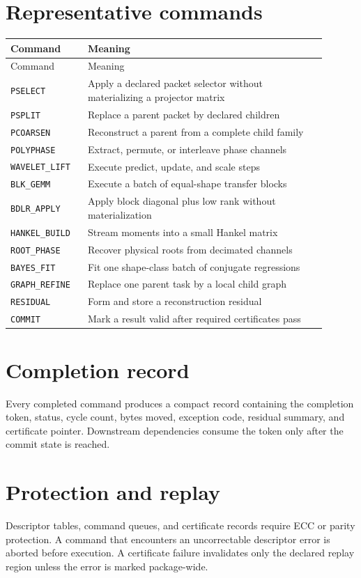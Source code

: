 \documentclass[11pt,oneside,openany]{book}
\theoremstyle{remark}
\begin{document}
\section{Representative commands}
\begin{longtable}{L{0.22\linewidth}L{0.68\linewidth}}
\toprule
Command & Meaning \\
\midrule
\endfirsthead
\toprule
Command & Meaning \\
\midrule
\endhead
\texttt{PSELECT} & Apply a declared packet selector without materializing a projector matrix \\
\texttt{PSPLIT} & Replace a parent packet by declared children \\
\texttt{PCOARSEN} & Reconstruct a parent from a complete child family \\
\texttt{POLYPHASE} & Extract, permute, or interleave phase channels \\
\texttt{WAVELET\_LIFT} & Execute predict, update, and scale steps \\
\texttt{BLK\_GEMM} & Execute a batch of equal-shape transfer blocks \\
\texttt{BDLR\_APPLY} & Apply block diagonal plus low rank without materialization \\
\texttt{HANKEL\_BUILD} & Stream moments into a small Hankel matrix \\
\texttt{ROOT\_PHASE} & Recover physical roots from decimated channels \\
\texttt{BAYES\_FIT} & Fit one shape-class batch of conjugate regressions \\
\texttt{GRAPH\_REFINE} & Replace one parent task by a local child graph \\
\texttt{RESIDUAL} & Form and store a reconstruction residual \\
\texttt{COMMIT} & Mark a result valid after required certificates pass \\
\bottomrule
\end{longtable}

\section{Completion record}
Every completed command produces a compact record containing the completion token, status, cycle count, bytes moved, exception code, residual summary, and certificate pointer. Downstream dependencies consume the token only after the commit state is reached.

\section{Protection and replay}
Descriptor tables, command queues, and certificate records require ECC or parity protection. A command that encounters an uncorrectable descriptor error is aborted before execution. A certificate failure invalidates only the declared replay region unless the error is marked package-wide.
\end{document}
